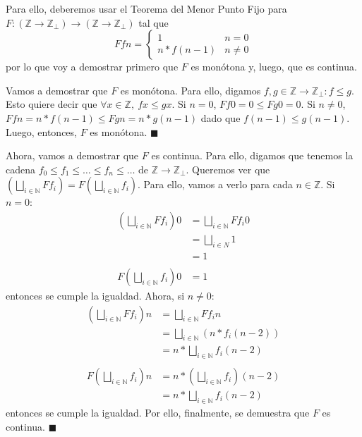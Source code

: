 \documentclass{article}
\newcommand{\N}{\mathbb{N}}
\newcommand{\Z}{\mathbb{Z}}
\newcommand{\supr}{\bigsqcup\limits}
\begin{document}
Para ello, deberemos usar el Teorema del Menor Punto Fijo para $F : (\Z \to \Z_\bot) \to (\Z \to \Z_\bot)$ tal que
\begin{equation*}
	F f n = \begin{cases}
		1            & n = 0    \\
		n * f(n - 1) & n \neq 0
	\end{cases}
\end{equation*}
por lo que voy a demostrar primero que $F$ es monótona y, luego, que es continua.

Vamos a demostrar que $F$ es monótona.
Para ello, digamos $f, g \in \Z \to \Z_\bot : f \leq g$.
Esto quiere decir que $\forall x \in \Z,\ f x \leq g x$.
Si $n = 0$, $F f 0 = 0 \leq F g 0 = 0$.
Si $n \neq 0$, $F f n = n * f(n - 1) \leq F g n = n * g(n - 1)$ dado que $f(n - 1) \leq g(n - 1)$.
Luego, entonces, $F$ es monótona. $\blacksquare$

Ahora, vamos a demostrar que $F$ es continua.
Para ello, digamos que tenemos la cadena $f_0 \leq f_1 \leq \dots \leq f_n \leq \dots$ de $\Z \to \Z_\bot$.
Queremos ver que $\left(\supr_{i \in \N} F f_i\right) = F\left(\supr_{i \in \N} f_i \right)$.
Para ello, vamos a verlo para cada $n \in \Z$.
Si $n = 0$:
\begin{equation*}
	\begin{aligned}
		\left(\supr_{i \in \N} F f_i\right) 0 & = \supr_{i \in \N} F f_i 0 \\
		                                      & = \supr_{i \in N} 1        \\
		                                      & = 1                        \\
		\\
		F\left(\supr_{i \in \N} f_i\right) 0  & = 1
	\end{aligned}
\end{equation*}
entonces se cumple la igualdad.
Ahora, si $n \neq 0$:
\begin{equation*}
	\begin{aligned}
		\left(\supr_{i \in \N} F f_i\right) n & = \supr_{i \in \N} F f_i n                     \\
		                                      & = \supr_{i \in \N} (n * f_i(n - 2))            \\
		                                      & = n * \supr_{i \in \N} f_i(n - 2)              \\
		\\
		F\left(\supr_{i \in \N} f_i\right) n  & = n * \left(\supr_{i \in \N} f_i\right)(n - 2) \\
		                                      & = n * \supr_{i \in \N} f_i(n - 2)
	\end{aligned}
\end{equation*}
entonces se cumple la igualdad.
Por ello, finalmente, se demuestra que $F$ es continua. $\blacksquare$
\end{document}

